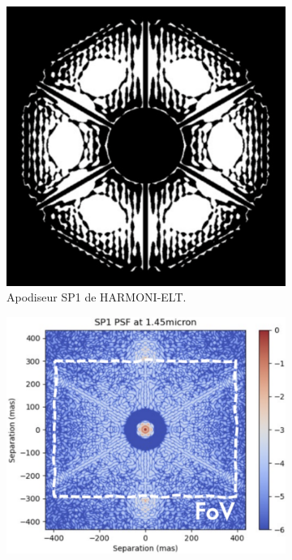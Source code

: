 \begin{figure}[htbp]
\centering
\begin{subfigure}[b]{0.40\textwidth}
\centering
\includegraphics[width=\textwidth]{figures/SP1_HARMONI.png}
\caption{Apodiseur SP1 de HARMONI-ELT.}
\end{subfigure}
\hfill %
\begin{subfigure}[b]{0.45\textwidth}
\centering
\includegraphics[width=\textwidth]{figures/PSF_SP1_HARMONI.png}

\end{subfigure}
\end{figure}
